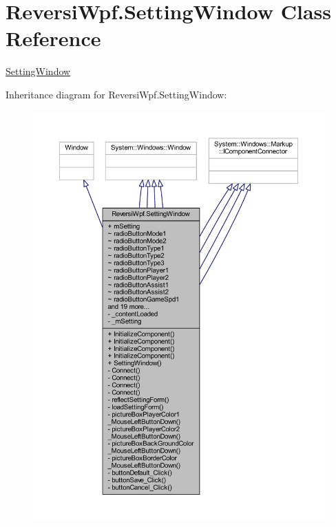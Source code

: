 \hypertarget{class_reversi_wpf_1_1_setting_window}{}\section{Reversi\+Wpf.\+Setting\+Window Class Reference}
\label{class_reversi_wpf_1_1_setting_window}


\hyperlink{class_reversi_wpf_1_1_setting_window}{Setting\+Window}  




Inheritance diagram for Reversi\+Wpf.\+Setting\+Window\+:\nopagebreak
\begin{figure}[H]
\begin{center}
\leavevmode
\includegraphics[width=350pt]{class_reversi_wpf_1_1_setting_window__inherit__graph}
\end{center}
\end{figure}



